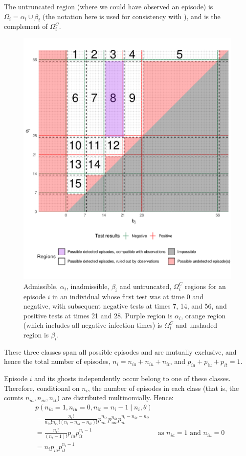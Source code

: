\documentclass[thesis.tex]{subfiles}
\begin{document}
The untruncated region (where we could have observed an episode) is
$\Omega_i = \alpha_i \cup \beta_i$ (the notation here is used for
consistency with \textcite{heiseyModelling}), and is the
complement of $\Omega^C_i$.

\begin{figure}
\includegraphics[width=\textwidth]{cis-perfect-testing/regions_diag}
\caption{Admissible, $\alpha_i$, inadmissible, $\beta_i$ and
untruncated, $\Omega_i^C$ regions for an episode $i$ in an
individual whose first test was at time 0 and negative, with subsequent
negative tests at times 7, 14, and 56, and positive tests at times 21
and 28. Purple region is $\alpha_i$, orange region (which includes all
negative infection times) is $\Omega_i^C$ and unshaded region is
$\beta_i$.\label{perf-test:fig:partitionSpace}}
\end{figure}

These three classes span all possible episodes and are mutually
exclusive, and hence the total number of episodes,
$n_i = n_{ia} + n_{iu} + n_{it}$, and
$p_{ia} + p_{iu} + p_{it} = 1$.

Episode $i$ and its ghosts independently occur belong to one of these
classes. Therefore, conditional on $n_i$, the number of episodes in
each class (that is, the counts $n_{ia}, n_{iu}, n_{it}$) are
distributed multinomially. Hence:
\begin{align}
&p(n_{ia} = 1, n_{iu} = 0, n_{it} = n_i - 1 \mid n_i, \theta) \\
&= \frac{n_i!}{n_{ia}! n_{iu}! (n_i- n_{ia} - n_{it})!} p_{ia}^{n_{ia}} p_{ua}^{n_{ia}} p_{it}^{n_i- n_{ia} - n_{it}} \\
&= \frac{n_i!}{(n_i-1)!} p_{ia} p_{it}^{n_i- 1} &\text{as $n_{ia} = 1$ and $n_{iu} = 0$}\\
&= n_i p_{ia} p_{it}^{n_i- 1}
\end{align}
\end{document}
